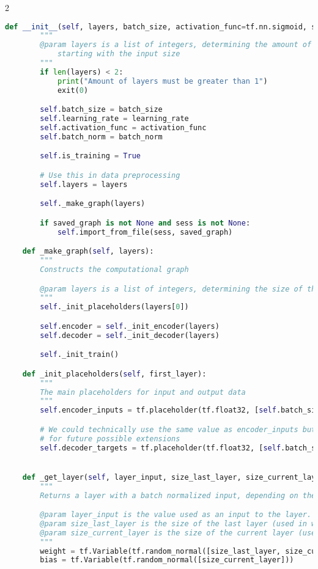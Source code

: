 \begin{landscape}
\begin{multicols}{2}
\begin{lstlisting}[language=Python]
    def __init__(self, layers, batch_size, activation_func=tf.nn.sigmoid, saved_graph=None, sess=None, learning_rate=0.0001, batch_norm=False):
        """
        @param layers is a list of integers, determining the amount of layers and their size
            starting with the input size
        """
        if len(layers) < 2:
            print("Amount of layers must be greater than 1")
            exit(0)

        self.batch_size = batch_size
        self.learning_rate = learning_rate
        self.activation_func = activation_func
        self.batch_norm = batch_norm

        self.is_training = True

        # Use this in data preprocessing
        self.layers = layers

        self._make_graph(layers)

        if saved_graph is not None and sess is not None:
            self.import_from_file(sess, saved_graph)

    def _make_graph(self, layers):
        """
        Constructs the computational graph

        @param layers is a list of integers, determining the size of the layers
        """
        self._init_placeholders(layers[0])

        self.encoder = self._init_encoder(layers)
        self.decoder = self._init_decoder(layers)

        self._init_train()

    def _init_placeholders(self, first_layer):
        """
        The main placeholders for input and output data
        """
        self.encoder_inputs = tf.placeholder(tf.float32, [self.batch_size, first_layer])

        # We could technically use the same value as encoder_inputs but we do not
        # for future possible extensions
        self.decoder_targets = tf.placeholder(tf.float32, [self.batch_size, first_layer])


    def _get_layer(self, layer_input, size_last_layer, size_current_layer):
        """
        Returns a layer with a batch normalized input, depending on the `batch_norm flag`

        @param layer_input is the value used as an input to the layer.
        @param size_last_layer is the size of the last layer (used in weight) or the size of the input
        @param size_current_layer is the size of the current layer (used in weight and bias)
        """
        weight = tf.Variable(tf.random_normal([size_last_layer, size_current_layer]))
        bias = tf.Variable(tf.random_normal([size_current_layer]))


\end{lstlisting}
\end{multicols}
\end{landscape}

